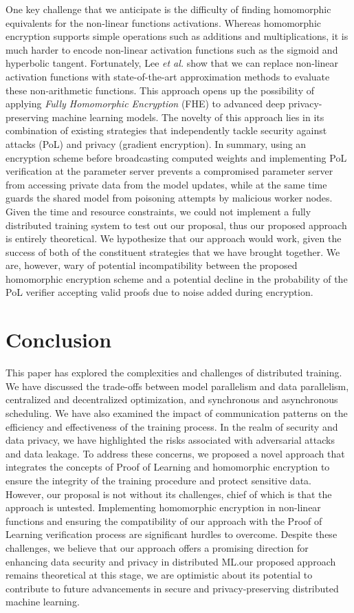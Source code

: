\documentclass[11pt]{article}
\begin{document}
One key challenge that we anticipate is the difficulty of finding homomorphic equivalents for the non-linear functions activations. Whereas homomorphic encryption supports simple operations such as additions and multiplications, it is much harder to encode non-linear activation functions such as the sigmoid and hyperbolic tangent. Fortunately, Lee \textit{et al.}\cite{lee2022privacy} show that we can replace non-linear activation functions with state-of-the-art approximation methods to evaluate these non-arithmetic functions. This approach opens up the possibility of applying  \textit{Fully Homomorphic Encryption} (FHE) to advanced deep privacy-preserving machine learning models. The novelty of this approach lies in its combination of existing strategies that independently tackle security against attacks (PoL) and privacy (gradient encryption). In summary, using an encryption scheme before broadcasting computed weights and implementing PoL verification at the parameter server prevents a compromised parameter server from accessing private data from the model updates, while at the same time guards the shared model from poisoning attempts by malicious worker nodes.
Given the time and resource constraints, we could not implement a fully distributed training system to test out our proposal, thus our proposed approach is entirely theoretical. We hypothesize that our approach would work, given the success of both of the constituent strategies that we have brought together. We are, however, wary of potential incompatibility between the proposed homomorphic encryption scheme and a potential decline in the probability of the PoL verifier accepting valid proofs due to noise added during encryption.

\section*{Conclusion}

This paper has explored the complexities and challenges of distributed training. We have discussed the trade-offs between model parallelism and data parallelism, centralized and decentralized optimization, and synchronous and asynchronous scheduling. We have also examined the impact of communication patterns on the efficiency and effectiveness of the training process. In the realm of security and data privacy, we have highlighted the risks associated with adversarial attacks and data leakage. To address these concerns, we proposed a novel approach that integrates the concepts of Proof of Learning and homomorphic encryption to ensure the integrity of the training procedure and protect sensitive data.
However, our proposal is not without its challenges, chief of which is that the approach is untested. Implementing homomorphic encryption in non-linear functions and ensuring the compatibility of our approach with the Proof of Learning verification process are significant hurdles to overcome. Despite these challenges, we believe that our approach offers a promising direction for enhancing data security and privacy in distributed ML.\@While our proposed approach remains theoretical at this stage, we are optimistic about its potential to contribute to future advancements in secure and privacy-preserving distributed machine learning.

\end{document}
